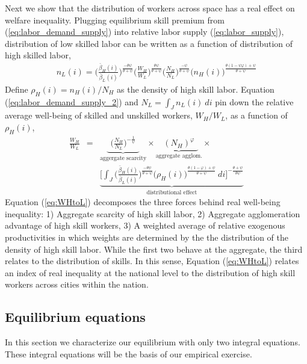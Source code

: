 \documentclass[12 pt]{article}
\begin{document}
Next we show that the distribution of workers across space has a real effect on welfare inequality.  Plugging equilibrium skill premium from (\ref{eq:labor_demand_supply}) into relative labor supply (\ref{eq:labor_supply}), distribution of low skilled labor can be written as a function of distribution of high skilled labor,
\begin{eqnarray}\label{eq:labor_demand_supply_2}
n_L(i) = \Big( \frac{\bar{\beta}_H(i)}{\bar{\beta}_L(i)} \Big)^{\frac{-\theta\psi}{\theta+\psi}} 
\Big( \frac{W_H}{W_L} \Big)^{\frac{\theta\psi}{\theta+\psi}}
\Big( \frac{N_H}{N_L} \Big)^{\frac{-\psi}{\theta+\psi}}
\Big( n_H(i) \Big)^{\frac{\theta(1-\psi\varphi)+\psi}{\theta+\psi}}
\end{eqnarray}
Define $\rho_H(i) = n_H(i)/N_H$ as the density of high skill labor. Equation (\ref{eq:labor_demand_supply_2}) and $ N_L = \int_J n_L(i)~di $ pin down the relative average well-being of skilled and unskilled workers, $W_H/W_L$, as a function of $\rho_H(i)$,
\begin{eqnarray}\label{eq:WHtoL}
\frac{W_H}{W_L} & = &
\underbrace{~~\Big(\frac{N_H}{N_L}\Big)^{-\frac{1}{\psi}}~~}_{\mbox{aggergate scarcity}} \times \underbrace{~~(N_H)^{\varphi}~~}_{\mbox{aggregate agglom.}} \times \nonumber \\
&  &
\underbrace{\Bigg[ \int_J \Big( \frac{\bar{\beta}_H(i)}{\bar{\beta}_L(i)} \Big)^{\frac{-\theta\psi}{\theta+\psi}} \Big( \rho_H(i) \Big)^{\frac{\theta(1-\varphi)+\psi}{\theta+\psi}}~di \Bigg]^{-\frac{\theta+\psi}{\theta\psi}}}_{\mbox{distributional effect}} 
\end{eqnarray}
Equation (\ref{eq:WHtoL}) decomposes the three forces behind real well-being inequality: 1) Aggregate scarcity of high skill labor, 2) Aggregate agglomeration advantage of high skill workers, 3) A weighted average of relative exogenous productivities in which weights are determined by the the distribution of the density of high skill labor. While the  first two behave at the aggregate, the third relates to the distribution of skills. 
In this sense, Equation (\ref{eq:WHtoL}) relates an index of real inequality at the national level to the distribution of high skill workers across cities within the nation.
\subsection{Equilibrium equations}

In this section we characterize our equilibrium with only two integral equations.  These integral equations will be the basis of our empirical exercise.  
\end{document}
